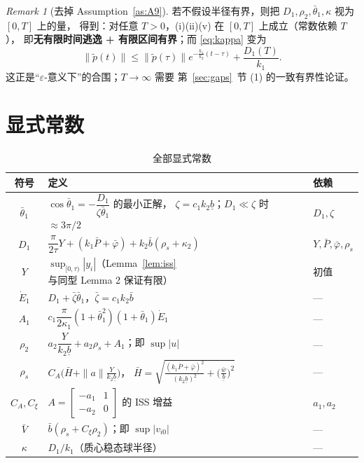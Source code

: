 \documentclass[11pt,a4paper]{article}
\newcommand{\ub}{\underline{b}}
\theoremstyle{plain}
\theoremstyle{definition}
\theoremstyle{remark}
\newtheorem{remark}[theorem]{Remark}
\begin{document}
\begin{remark}[去掉 Assumption~\ref{as:A9}]
若不假设半径有界，则把 $D_1,\rho_2,\bar\theta_1,\kappa$ 视为 $[0,T]$ 上的量，
得到：对任意 $T>0$，(i)(ii)(v) 在 $[0,T]$ 上成立（常数依赖 $T$），
即\textbf{无有限时间逃逸 + 有限区间有界}；而 \eqref{eq:kappa} 变为
\begin{equation*}
\|\tilde p(t)\|\le\|\tilde p(\tau)\|e^{-\frac{k_1}{k_2}(t-\tau)}
+\frac{D_1(T)}{k_1}.
\end{equation*}
这正是“$\varepsilon$-意义下”的合围；$T\to\infty$ 需要
第~\ref{sec:gaps}~节 (1) 的一致有界性论证。
\end{remark}

\section{显式常数}\label{sec:const}
\begin{table}[H]
\centering
\footnotesize
\caption{全部显式常数}
\begin{tabular}{c|p{7.3cm}|p{4.4cm}}
\hline
符号 & 定义 & 依赖\\
\hline
$\bar\theta_1$ & $\cos\bar\theta_1=-\dfrac{D_1}{\zeta\bar\theta_1}$ 的最小正解，
$\zeta=c_1k_2\ub$；$D_1\ll\zeta$ 时 $\approx 3\pi/2$ & $D_1,\zeta$\\
\hline
$D_1$ & $\dfrac{\pi}{2\tau}Y+(k_1\bar P+\bar\varphi)+k_2\bar b(\rho_s+\kappa_2)$
& $Y,\bar P,\bar\varphi,\rho_s$\\
\hline
$Y$ & $\sup_{[0,\tau)}|y_i|$（Lemma~\ref{lem:iss} 与同型 Lemma 2 保证有限） & 初值\\
\hline
$\dot E_1$ & $D_1+\bar\zeta\bar\theta_1$，$\bar\zeta=c_1k_2\bar b$ & ---\\
\hline
$A_1$ & $c_1\dfrac{\pi}{2\kappa_1}(1+\bar\theta_1^2)(1+\bar\theta_1)\dot E_1$ & ---\\
\hline
$\rho_2$ & $a_2\dfrac{Y}{k_2\ub}+a_2\rho_s+A_1$；即 $\sup|u|$ & ---\\
\hline
$\rho_s$ & $C_A\bigl(\bar H+\|a\|\frac{Y}{k_2\ub}\bigr)$，
$\bar H=\sqrt{\frac{(k_1\bar P+\bar\varphi)^2}{(k_2\ub)^2}+\bigl(\frac{\bar w}{\ub}\bigr)^2}$ & ---\\
\hline
$C_A,C_\xi$ & $A=\begin{bmatrix}-a_1&1\\-a_2&0\end{bmatrix}$ 的 ISS 增益 & $a_1,a_2$\\
\hline
$\bar V$ & $\bar b(\rho_s+C_\xi\rho_2)$；即 $\sup|v_{i0}|$ & ---\\
\hline
$\kappa$ & $D_1/k_1$（质心稳态球半径） & ---\\
\hline
\end{tabular}
\end{table}
\end{document}
